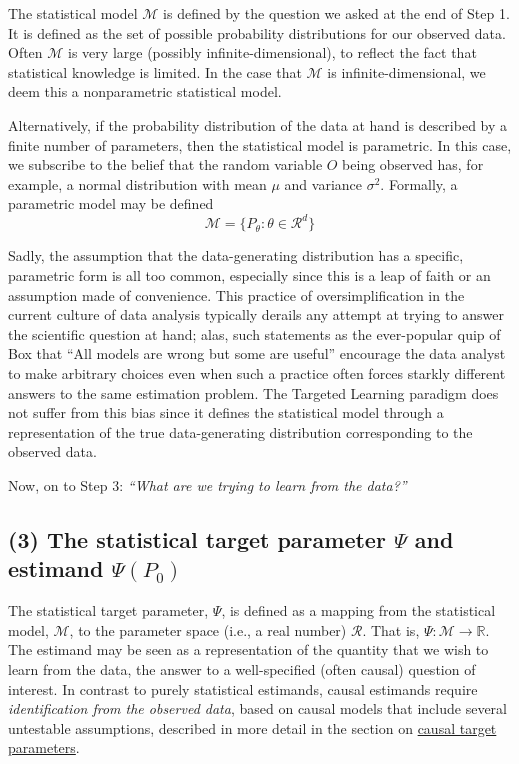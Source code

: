 \documentclass[12pt, krantz2,]{book}
\theoremstyle{definition}
\theoremstyle{definition}
\theoremstyle{definition}
\newcommand{\1}{\mathbbm{1}}
\begin{document}
The statistical model \(\mathcal{M}\) is defined by the question we asked at the
end of Step 1. It is defined as the set of possible probability
distributions for our observed data. Often \(\mathcal{M}\) is very large (possibly
infinite-dimensional), to reflect the fact that statistical knowledge is
limited. In the case that \(\mathcal{M}\) is infinite-dimensional, we deem this a
nonparametric statistical model.

Alternatively, if the probability distribution of the data at hand is described
by a finite number of parameters, then the statistical model is parametric. In
this case, we subscribe to the belief that the random variable \(O\) being
observed has, for example, a normal distribution with mean \(\mu\) and variance
\(\sigma^2\). Formally, a parametric model may be defined
\begin{equation*}
  \mathcal{M} = \{P_{\theta} : \theta \in \mathcal{R}^d \}
\end{equation*}

Sadly, the assumption that the data-generating distribution has a specific,
parametric form is all too common, especially since this is a leap of faith or
an assumption made of convenience. This practice of oversimplification in the
current culture of data analysis typically derails any attempt at trying to
answer the scientific question at hand; alas, such statements as the
ever-popular quip of Box that ``All models are wrong but some are useful''
encourage the data analyst to make arbitrary choices even when such a practice
often forces starkly different answers to the same estimation problem. The
Targeted Learning paradigm does not suffer from this bias since it defines the
statistical model through a representation of the true data-generating
distribution corresponding to the observed data.

Now, on to Step 3: \emph{``What are we trying to learn from the data?''}

\hypertarget{the-statistical-target-parameter-psi-and-estimand-psip_0}{%
\subsection*{\texorpdfstring{(3) The statistical target parameter \(\Psi\) and estimand \(\Psi(P_0)\)}{(3) The statistical target parameter \textbackslash{}Psi and estimand \textbackslash{}Psi(P\_0)}}\label{the-statistical-target-parameter-psi-and-estimand-psip_0}}


The statistical target parameter, \(\Psi\), is defined as a mapping from the
statistical model, \(\mathcal{M}\), to the parameter space (i.e., a real number)
\(\mathcal{R}\). That is, \(\Psi: \mathcal{M}\rightarrow\mathbb{R}\). The estimand
may be seen as a representation of the quantity that we wish to learn from the
data, the answer to a well-specified (often causal) question of interest. In
contrast to purely statistical estimands, causal estimands require
\emph{identification from the observed data}, based on causal models that include
several untestable assumptions, described in more detail in the section on
\protect\hyperlink{causal}{causal target parameters}.
\end{document}
